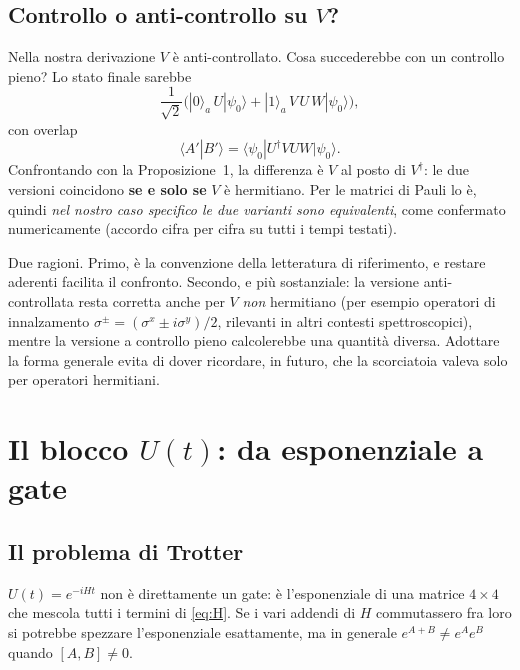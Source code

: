 \documentclass[11pt,a4paper]{article}
\begin{document}
\subsection{Controllo o anti-controllo su $V$?}

Nella nostra derivazione $V$ è anti-controllato. Cosa succederebbe con un controllo pieno? Lo
stato finale sarebbe
\begin{equation}
\frac{1}{\sqrt2}\Big(|0\rangle_a\,U|\psi_0\rangle+|1\rangle_a\,V\,U\,W|\psi_0\rangle\Big),
\end{equation}
con overlap
\begin{equation}
\langle A'|B'\rangle=\langle\psi_0|U^\dagger V U W|\psi_0\rangle .
\end{equation}
Confrontando con la Proposizione~1, la differenza è $V$ al posto di $V^\dagger$: le due versioni
coincidono \textbf{se e solo se} $V$ è hermitiano. Per le matrici di Pauli lo è, quindi
\emph{nel nostro caso specifico le due varianti sono equivalenti}, come confermato
numericamente (accordo cifra per cifra su tutti i tempi testati).

\begin{warnbox}
Due ragioni. Primo, è la convenzione della letteratura di riferimento, e restare aderenti
facilita il confronto. Secondo, e più sostanziale: la versione anti-controllata resta corretta
anche per $V$ \emph{non} hermitiano (per esempio operatori di innalzamento
$\sigma^\pm=(\sigma^x\pm i\sigma^y)/2$, rilevanti in altri contesti spettroscopici), mentre la
versione a controllo pieno calcolerebbe una quantità diversa. Adottare la forma generale evita
di dover ricordare, in futuro, che la scorciatoia valeva solo per operatori hermitiani.
\end{warnbox}

\section{Il blocco $U(t)$: da esponenziale a gate}

\subsection{Il problema di Trotter}

$U(t)=e^{-iHt}$ non è direttamente un gate: è l'esponenziale di una matrice $4\times4$ che
mescola tutti i termini di \eqref{eq:H}. Se i vari addendi di $H$ commutassero fra loro si
potrebbe spezzare l'esponenziale esattamente, ma in generale $e^{A+B}\neq e^Ae^B$ quando
$[A,B]\neq0$.
\end{document}
